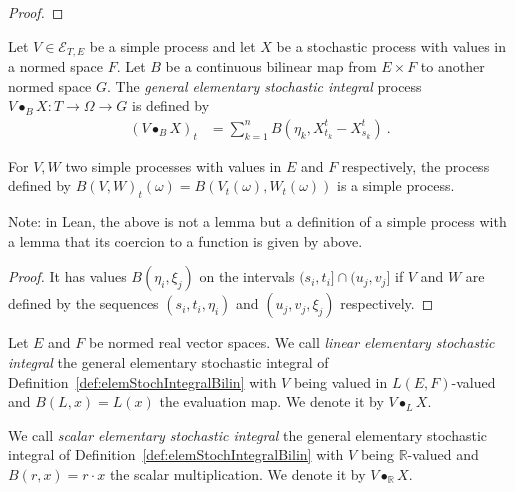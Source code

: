 \begin{proof}
  \leanok
\end{proof}


\begin{definition}\label{def:elemStochIntegralBilin}
  \leanok
Let $V \in \mathcal{E}_{T, E}$ be a simple process and let $X$ be a stochastic process with values in a normed space $F$.
Let $B$ be a continuous bilinear map from $E \times F$ to another normed space $G$.
The \emph{general elementary stochastic integral} process $V \bullet_B X : T \to \Omega \to G$ is defined by
\begin{align*}
  (V \bullet_B X)_t
  &= \sum_{k=1}^{n} B (\eta_k, X^t_{t_k} - X^t_{s_k})
  \: .
\end{align*}
\end{definition}


\begin{lemma}\label{lem:simpleProcess_map2}
  \leanok
For $V, W$ two simple processes with values in $E$ and $F$ respectively, the process defined by $B(V, W)_t(\omega) = B(V_t(\omega), W_t(\omega))$ is a simple process.

Note: in Lean, the above is not a lemma but a definition of a simple process with a lemma that its coercion to a function is given by above.
\end{lemma}

\begin{proof}
  \leanok
It has values $B(\eta_i, \xi_j)$ on the intervals $(s_i, t_i] \cap (u_j, v_j]$ if $V$ and $W$ are defined by the sequences $(s_i, t_i, \eta_i)$ and $(u_j, v_j, \xi_j)$ respectively.
\end{proof}


\begin{definition}\label{def:elemStochIntegralLinear}
  \leanok
Let $E$ and $F$ be normed real vector spaces.
We call \emph{linear elementary stochastic integral} the general elementary stochastic integral of Definition~\ref{def:elemStochIntegralBilin} with $V$ being valued in $L(E, F)$-valued and $B(L, x) = L(x)$ the evaluation map.
We denote it by $V \bullet_L X$.
\end{definition}


\begin{definition}\label{def:elemStochIntegral}
We call \emph{scalar elementary stochastic integral} the general elementary stochastic integral of Definition~\ref{def:elemStochIntegralBilin} with $V$ being $\mathbb{R}$-valued and $B(r, x) = r \cdot x$ the scalar multiplication.
We denote it by $V \bullet_{\mathbb{R}} X$.
\end{definition}


